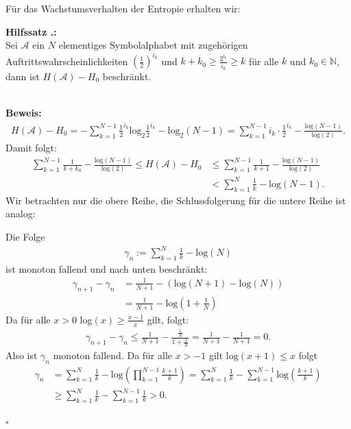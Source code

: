 \documentclass[a4paper,12pt]{article}
\newcommand{\N}{\mathbb N}
\newcommand{\A}{\mathcal A}
\newcounter{Hilfssatz}
\newenvironment{Hilfssatz}{
\medskip
        
        \setlength{\parindent}{0pt}
        \addtocounter{Hilfssatz}{1}
        \textbf{\textsf{Hilfssatz \thesubsection.\theHilfssatz}:}\\}{
        \nopagebreak
        \vspace{-1.0ex}
        \bigskip\\
}
\newenvironment{proof}{
        \setlength{\parindent}{0pt}
        \textbf{Beweis:}\\}{
        \nopagebreak
        \vspace{-1.0ex}
        \begin{flushright}
             $\square$
        \end{flushright}
        \bigskip
        
}
\begin{document}
Für das Wachstumsverhalten der Entropie erhalten wir:
\begin{Hilfssatz}
Sei $\A$ ein $N$ elementiges Symbolalphabet mit zugehörigen Auftrittswahrscheinlichkeiten $\left(\frac{1}{2}\right)^{i_{k}}$ und $k+k_{0}\geq\frac{2^{i_k}}{i_k} \geq k$ für alle $k$ und $k_{0}\in\N$, dann ist $H(\A)-H_{0}$ beschränkt.
\end{Hilfssatz}
\begin{proof}
\begin{align*}
H(\A) - H_{0} =-\sum_{k=1}^{N-1}\frac{1}{2}^{i_{k}} \text{log}_{2}\frac{1}{2}^{i_{k}} - \text{log}_{2}(N-1)
= \sum_{k=1}^{N-1}i_{k}\cdot \frac{1}{2}^{i_{k}} - \frac{\text{log}(N-1)}{\text{log}(2)}.
\end{align*}
Damit folgt:
\begin{align*}
\sum_{k=1}^{N-1}\frac{1}{k+k_{0}} - \frac{\text{log}(N-1)}{\text{log}(2)} \leq H(\A) - H_{0} &\leq \sum_{k=1}^{N-1} \frac{1}{k+1} - \frac{\text{log}(N-1)}{\text{log}(2)}
\\
& <  \sum_{k=1}^{N} \frac{1}{k} - \text{log}(N-1) .
\end{align*}
Wir betrachten nur die obere Reihe, die Schlussfolgerung für die untere Reihe ist analog:
\par
Die Folge 
\begin{align*}
\gamma_{n}:= \sum_{k=1}^{N} \frac{1}{k} - \text{log}(N) 
\end{align*}
ist monoton fallend und nach unten beschränkt:
\begin{align*}
\gamma_{n+1}-\gamma_{n} &= \frac{1}{N+1} - \left(\text{log}(N+1) - \text{log}(N)\right) 
\\
& = \frac{1}{N+1} - \text{log}\left(1+\frac{1}{N}\right)
\end{align*}
Da für alle $x > 0$ log$(x) \geq \frac{x-1}{x}$ gilt, folgt:
\begin{align*}
\gamma_{n+1}-\gamma_{n} \leq \frac{1}{N+1} - \frac{\frac{1}{N}}{1+\frac{1}{N}} = \frac{1}{N+1} - \frac{1}{N+1} = 0.
\end{align*}
Also ist $\gamma_n$ monoton fallend.
Da für alle $x>-1$ gilt $\text{log}(x+1)\leq x$ folgt
\begin{align*}
\gamma_{n} &= \sum_{k=1}^{N}\frac{1}{k} -\text{log}\left(\prod_{k=1}^{N-1}\frac{k+1}{k}\right) = \sum_{k=1}^{N}\frac{1}{k} - \sum_{k=1}^{N-1}\text{log}\left(\frac{k+1}{k}\right) 
\\
&\geq \sum_{k=1}^{N}\frac{1}{k} -  \sum_{k=1}^{N-1}\frac{1}{k} > 0.
\end{align*}
\end{proof}
\end{document}
